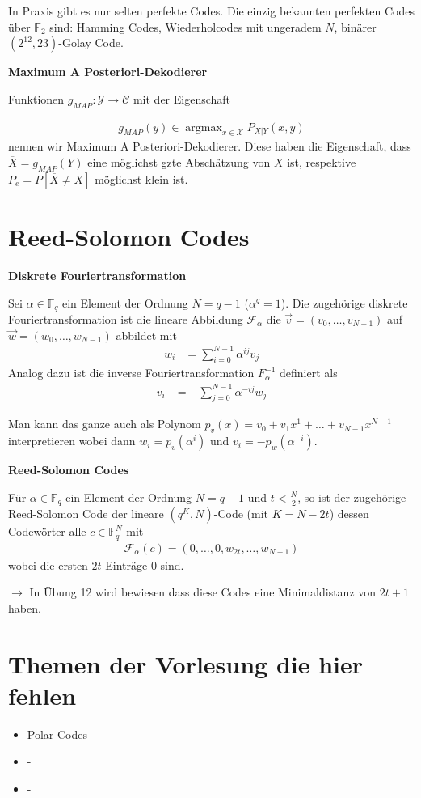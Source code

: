 \documentclass[25pt]{sciposter}
\newcommand{\F}{\mathcal{F}}
\newcommand{\X}{\mathcal{X}}
\newcommand{\C}{\mathcal{C}}
\newenvironment{defn}[1]{\begin{mdframed}[backgroundcolor=blue!10,innertopmargin=15pt, nobreak=true,innerbottommargin=15pt]
		\textbf{#1 }
	}
	{ 
	\end{mdframed}
}
\begin{document}
\begin{multicols}{3}
In Praxis gibt es nur selten perfekte Codes. Die einzig bekannten perfekten Codes über $\mathbb{F}_2$ sind: Hamming Codes, Wiederholcodes mit ungeradem $N$, binärer $(2^{12},23)$-Golay Code.

\begin{defn}{Maximum A Posteriori-Dekodierer}
	Funktionen $g_{MAP} : \mathcal{Y}\to \C$ mit der Eigenschaft 
	
	\begin{align*}
		g_{MAP}(y) \in \operatorname{argmax}_{x\in \X} P_{X|Y} (x,y)
	\end{align*}
	nennen wir Maximum A Posteriori-Dekodierer. Diese haben die Eigenschaft, dass $\overline{X} = g_{MAP}(Y)$ eine möglichst gzte Abschätzung von $X$ ist, respektive $P_e = P[\overline{X}\neq X]$ möglichst klein ist.
\end{defn}


\section{Reed-Solomon Codes}

\begin{defn}{Diskrete Fouriertransformation}
	Sei $\alpha \in \mathbb{F}_q$ ein Element der Ordnung $N = q-1$ ($\alpha^q = 1$). Die zugehörige diskrete Fouriertransformation ist die lineare Abbildung $\F_\alpha$ die $\vec{v} = (v_0,\ldots,v_{N-1})$ auf $\vec{w} = (w_0,\ldots,w_{N-1})$ abbildet mit 
	\begin{align*}
		w_i &= \sum_{i=0}^{N-1} \alpha^{ij} v_j
	\end{align*}
	Analog dazu ist die inverse Fouriertransformation $F_\alpha^{-1}$ definiert als 
	\begin{align*}
		v_i &= - \sum_{j=0}^{N-1} \alpha^{-ij}w_j
	\end{align*}
\end{defn}
Man kann das ganze auch als Polynom $p_v(x) = v_0 + v_1x^1 + \ldots + v_{N-1}x^{N-1}$ interpretieren wobei dann $w_i = p_v(\alpha^i)$ und $v_i = -p_w(\alpha^{-i})$.

\begin{defn}{Reed-Solomon Codes}
	Für $\alpha\in \mathbb{F}_q$ ein Element der Ordnung $N=q-1$ und $t<\frac{N}{2}$, so ist der zugehörige Reed-Solomon Code der lineare $(q^K,N)$-Code (mit $K=N-2t$) dessen Codewörter alle $c\in \mathbb{F}_q^N$ mit 
	\begin{align*}
		\F_\alpha (c) = (0,\ldots,0,w_{2t},\ldots,w_{N-1})
	\end{align*}
	wobei die ersten $2t$ Einträge 0 sind.
\end{defn}
$\rightarrow$ In Übung 12 wird bewiesen dass diese Codes eine Minimaldistanz von $2t+1$ haben.

\section{Themen der Vorlesung die hier fehlen}

\begin{itemize}
	\item Polar Codes
	\item -
	\item -
\end{itemize}



\newpage

\end{multicols}
\end{document}
